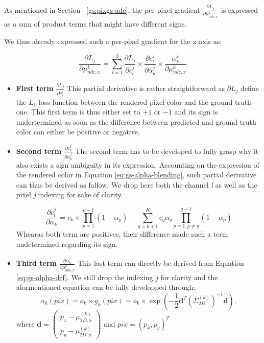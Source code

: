 As mentioned in Section ~\ref{gs:pixgs-adc}, the per-pixel gradient $\frac{\partial L_{j}}{\partial \mu^{k}_{ndc,x}}$ is expressed as a sum of product terms that might have different signs. 

We thus already expressed such a per-pixel gradient for the x-axis as: 

\begin{equation}
    \label{eq:perpix-grad-appendix}
    \frac{\partial L_{j}}{\partial \mu^{k}_{ndc,x}} = \sum \limits_{l=1}^{3} \frac{\partial L_{j}}{\partial c_{l}^{j}}\times \frac{\partial c_{l}^{j}}{\partial \alpha_{k}^{j}} \times \frac{\alpha_{k}^{j}}{\partial \mu^{k}_{ndc,x} }
    \end{equation}

\begin{itemize}
    
    \item \textbf{First term} $\frac{\partial L_{j}}{\partial c_{l}^{j}}$ 
This partial derivative is rather straightforward as $\partial L_{j}$ define the $L_{1}$ loss function between the rendered pixel color and the ground truth one. This first term is thus either set to $+1$ or $-1$ and its sign is undertermined as soon as the difference between predicted and ground truth color can either be positive or negative. 

    \item \textbf{Second term} $\frac{\partial c_{l}^{j}}{\partial \alpha_{k}^{j}}$ 
The second term has to be developed to fully grasp why it also exists a sign ambiguity in its expression. Accounting on the expression of the rendered color in Equation \eqref{eq:gs-alpha-blending}, such partial derivative can thus be derived as follow. We drop here both the channel  \textit{l} as well as the pixel \textit{j} indexing for sake of clarity.  

\begin{equation}
    \frac{\partial c_{l}^{j}}{\partial \alpha_{k}} = c_{k} \times \prod \limits_{p=1}^{k-1}(1 - \alpha_{p}) - \sum \limits_{q=k+1}^{K} c_{q}\alpha_{q}\prod \limits_{p=1,p\neq q}^{q-1}(1 - \alpha_{p})
\end{equation}
Whearas both term are positives, their difference made such a term undetermined regarding its sign. 

    \item \textbf{Third term} $\frac{\partial \alpha_{k}^{j}}{\partial \mu^{k}_{ndc,x}}$ 
This last term can directly be derived from Equation \eqref{eq:gs-alpha-def}. We still drop the indexing $j$ for clarity and the aformentioned equation can be fully developped through: 
\begin{equation}
    \alpha_{k}(pix) =o_{k} \times g_{k}(pix) =  o_{k} \times \exp \left( -\frac{1}{2} \mathbf{d}^T \left( \Sigma_{2D}^{(k)} \right)^{-1} \mathbf{d} \right),  
\end{equation}
where $\mathbf{d} = \begin{pmatrix}
    p_x - \mu_{2D,x}^{(k)} \\
    p_y - \mu_{2D,y}^{(k)}
\end{pmatrix}$ and $pix=\left( p_{x},p_{y}\right)^{T}$ 


\end{itemize}
